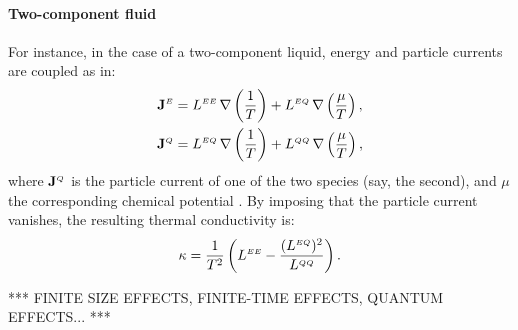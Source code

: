 \paragraph{Two-component fluid}
For instance, in the case of a two-component liquid, energy and particle currents are coupled as in:
\begin{equation}
  \begin{aligned}
    \mathbf{J}^\smallE &= L^{\smallE\smallE}\,  \nabla \left (\frac{1}{T} \right ) + L^{\smallE\smallQ} \, \nabla \left (\frac{\mu}{T} \right ), \\
    \mathbf{J}^{\smallQ} &= L^{\smallE\smallQ} \, \nabla \left (\frac{1}{T} \right ) + L^{\smallQ\smallQ} \, \nabla \left (\frac{\mu}{T} \right ), \label{eq:two-comp-constitutive}
  \end{aligned}
\end{equation}
where $\mathbf{J}^{{\scriptscriptstyle Q}}$ is the particle current of one of the two species (say, the second), and $\mu$ the corresponding chemical potential \cite{Sindzingre1990}. By imposing that the particle current vanishes, the resulting thermal conductivity is:
\begin{equation}
  \kappa=\frac{1}{T^2}
  \left( L^{\smallE\smallE} - \frac{(L^{\smallE\smallQ})^2}{L^{\smallQ\smallQ}} \right). \label{eq:two-comp-kappa}
\end{equation}


\bigskip
\bigskip
*** FINITE SIZE EFFECTS, FINITE-TIME EFFECTS, QUANTUM EFFECTS... ***
